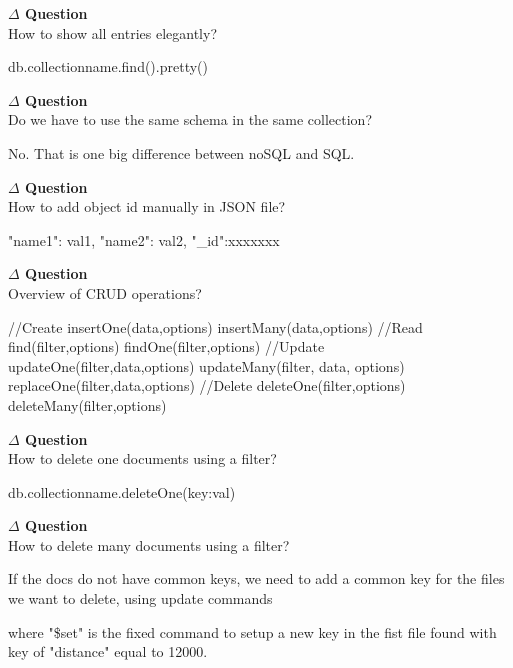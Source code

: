 \documentclass[12pt]{article}
\newenvironment{que}
    { \begin{mdframed}[backgroundcolor=green!20] \textbf{$\Delta$ Question} \\}
    {  \end{mdframed}}
\begin{document}
\begin{que}
How to show all entries elegantly?
\end{que}
\begin{code}
db.collectionname.find().pretty()
\end{code}
\begin{que}
Do we have to use the same schema in the same collection?
\end{que}
No. That is one big difference between noSQL and SQL.
\begin{que}
How to add object id manually in JSON file?
\end{que}
\begin{code}
{
"name1": val1,
"name2": val2,
"_id":xxxxxxx}
\end{code}
\begin{que}
Overview of CRUD operations?
\end{que}
\begin{code}
//Create
insertOne(data,options)
insertMany(data,options)
//Read
find(filter,options)
findOne(filter,options)
//Update
updateOne(filter,data,options)
updateMany(filter, data, options)
replaceOne(filter,data,options)
//Delete
deleteOne(filter,options)
deleteMany(filter,options)
\end{code}
\begin{que}
How to delete one documents using a filter?
\end{que}
\begin{code}
db.collectionname.deleteOne({key:val})
\end{code}
\begin{que}
How to delete many documents using a filter?
\end{que}
If the docs do not have common keys, we need to add a common key for the files we want to delete, using update commands
where "\$set" is the fixed command to setup a new key in the fist file found with key of "distance" equal to 12000.
\end{document}
